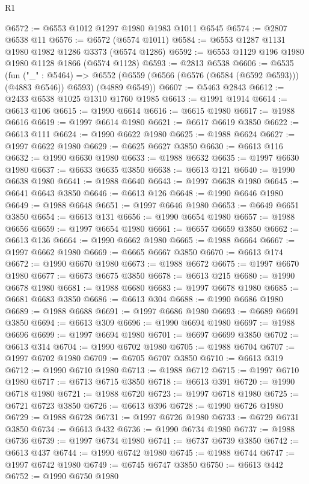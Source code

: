 \begin{lexlean}{R1}
\begin{coremodule}
@6572 := @6553 @1012 @1297 @1980 @1983 @1011 @6545
@6574 := @2807 @6538 @11
@6576 := @6572 (@6574 @1011)
@6584 := @6553 @1287 @1131 @1980 @1982 @1286 @3373 (@6574 @1286)
@6592 := @6553 @1129 @196 @1980 @1980 @1128 @1866 (@6574 @1128)
@6593 := @2813 @6538
@6606 := @6535
    (fun ("_" : @5464) =>
    @6552 (@6559 (@6566 (@6576 (@6584 (@6592 @6593))) (@4883 @6546)) @6593) (@4889 @6549))
@6607 := @5463 @2843
@6612 := @2433 @6538 @1025 @1310 @1760 @1985
@6613 := @1991 @1914
@6614 := @6613 @106
@6615 := @1990 @6614
@6616 := @6615 @1980
@6617 := @1988 @6616
@6619 := @1997 @6614 @1980
@6621 := @6617 @6619 @3850
@6622 := @6613 @111
@6624 := @1990 @6622 @1980
@6625 := @1988 @6624
@6627 := @1997 @6622 @1980
@6629 := @6625 @6627 @3850
@6630 := @6613 @116
@6632 := @1990 @6630 @1980
@6633 := @1988 @6632
@6635 := @1997 @6630 @1980
@6637 := @6633 @6635 @3850
@6638 := @6613 @121
@6640 := @1990 @6638 @1980
@6641 := @1988 @6640
@6643 := @1997 @6638 @1980
@6645 := @6641 @6643 @3850
@6646 := @6613 @126
@6648 := @1990 @6646 @1980
@6649 := @1988 @6648
@6651 := @1997 @6646 @1980
@6653 := @6649 @6651 @3850
@6654 := @6613 @131
@6656 := @1990 @6654 @1980
@6657 := @1988 @6656
@6659 := @1997 @6654 @1980
@6661 := @6657 @6659 @3850
@6662 := @6613 @136
@6664 := @1990 @6662 @1980
@6665 := @1988 @6664
@6667 := @1997 @6662 @1980
@6669 := @6665 @6667 @3850
@6670 := @6613 @174
@6672 := @1990 @6670 @1980
@6673 := @1988 @6672
@6675 := @1997 @6670 @1980
@6677 := @6673 @6675 @3850
@6678 := @6613 @215
@6680 := @1990 @6678 @1980
@6681 := @1988 @6680
@6683 := @1997 @6678 @1980
@6685 := @6681 @6683 @3850
@6686 := @6613 @304
@6688 := @1990 @6686 @1980
@6689 := @1988 @6688
@6691 := @1997 @6686 @1980
@6693 := @6689 @6691 @3850
@6694 := @6613 @309
@6696 := @1990 @6694 @1980
@6697 := @1988 @6696
@6699 := @1997 @6694 @1980
@6701 := @6697 @6699 @3850
@6702 := @6613 @314
@6704 := @1990 @6702 @1980
@6705 := @1988 @6704
@6707 := @1997 @6702 @1980
@6709 := @6705 @6707 @3850
@6710 := @6613 @319
@6712 := @1990 @6710 @1980
@6713 := @1988 @6712
@6715 := @1997 @6710 @1980
@6717 := @6713 @6715 @3850
@6718 := @6613 @391
@6720 := @1990 @6718 @1980
@6721 := @1988 @6720
@6723 := @1997 @6718 @1980
@6725 := @6721 @6723 @3850
@6726 := @6613 @396
@6728 := @1990 @6726 @1980
@6729 := @1988 @6728
@6731 := @1997 @6726 @1980
@6733 := @6729 @6731 @3850
@6734 := @6613 @432
@6736 := @1990 @6734 @1980
@6737 := @1988 @6736
@6739 := @1997 @6734 @1980
@6741 := @6737 @6739 @3850
@6742 := @6613 @437
@6744 := @1990 @6742 @1980
@6745 := @1988 @6744
@6747 := @1997 @6742 @1980
@6749 := @6745 @6747 @3850
@6750 := @6613 @442
@6752 := @1990 @6750 @1980

\end{coremodule}
\end{lexlean}
